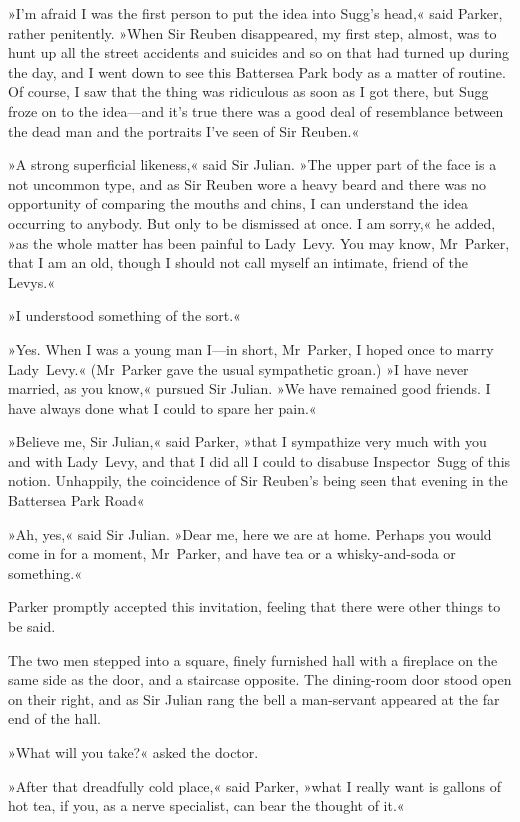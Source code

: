 »I'm afraid I was the first person to put the idea into Sugg's head,« said Parker, rather penitently. »When Sir Reuben disappeared, my first step, almost, was to hunt up all the street accidents and suicides and so on that had turned up during the day, and I went down to see this Battersea Park body as a matter of routine. Of course, I saw that the thing was ridiculous as soon as I got there, but Sugg froze on to the idea—and it's true there was a good deal of resemblance between the dead man and the portraits I've seen of Sir Reuben.«

»A strong superficial likeness,« said Sir Julian. »The upper part of the face is a not uncommon type, and as Sir Reuben wore a heavy beard and there was no opportunity of comparing the mouths and chins, I can understand the idea occurring to anybody. But only to be dismissed at once. I am sorry,« he added, »as the whole matter has been painful to Lady~Levy. You may know, Mr~Parker, that I am an old, though I should not call myself an intimate, friend of the Levys.«

»I understood something of the sort.«

»Yes. When I was a young man I—in short, Mr~Parker, I hoped once to marry Lady~Levy.« (Mr~Parker gave the usual sympathetic groan.) »I have never married, as you know,« pursued Sir Julian. »We have remained good friends. I have always done what I could to spare her pain.«

»Believe me, Sir Julian,« said Parker, »that I sympathize very much with you and with Lady~Levy, and that I did all I could to disabuse Inspector~Sugg of this notion. Unhappily, the coincidence of Sir Reuben's being seen that evening in the Battersea Park Road\longdash«

»Ah, yes,« said Sir Julian. »Dear me, here we are at home. Perhaps you would come in for a moment, Mr~Parker, and have tea or a whisky-and-soda or something.«

Parker promptly accepted this invitation, feeling that there were other things to be said.

The two men stepped into a square, finely furnished hall with a fireplace on the same side as the door, and a staircase opposite. The dining-room door stood open on their right, and as Sir Julian rang the bell a man-servant appeared at the far end of the hall.

»What will you take?« asked the doctor.

»After that dreadfully cold place,« said Parker, »what I really want is gallons of hot tea, if you, as a nerve specialist, can bear the thought of it.«

